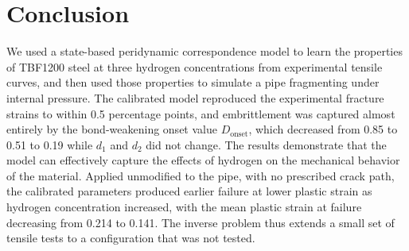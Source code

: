 \documentclass[pdflatex,sn-mathphys-num]{sn-jnl}%
\theoremstyle{thmstyleone}%
\theoremstyle{thmstyletwo}%
\theoremstyle{thmstylethree}%
\begin{document}
\section{Conclusion}\label{sec7}
We used a state-based peridynamic correspondence model to learn the properties of TBF1200 steel at three hydrogen concentrations from experimental tensile curves, and then used those properties to simulate a pipe fragmenting under internal pressure. The calibrated model reproduced the experimental fracture strains to within 0.5 percentage points, and embrittlement was captured almost entirely by the bond-weakening onset value $D_\mathrm{onset}$, which decreased from 0.85 to 0.51 to 0.19 while $d_1$ and $d_2$ did not change.  The results demonstrate that the model can effectively capture the effects of hydrogen on the mechanical behavior of the material. Applied unmodified to the pipe, with no prescribed crack path, the calibrated parameters produced earlier failure at lower plastic strain as hydrogen concentration increased, with the mean plastic strain at failure decreasing from 0.214 to 0.141. The inverse problem thus extends a small set of tensile tests to a configuration that was not tested.

\end{document}
